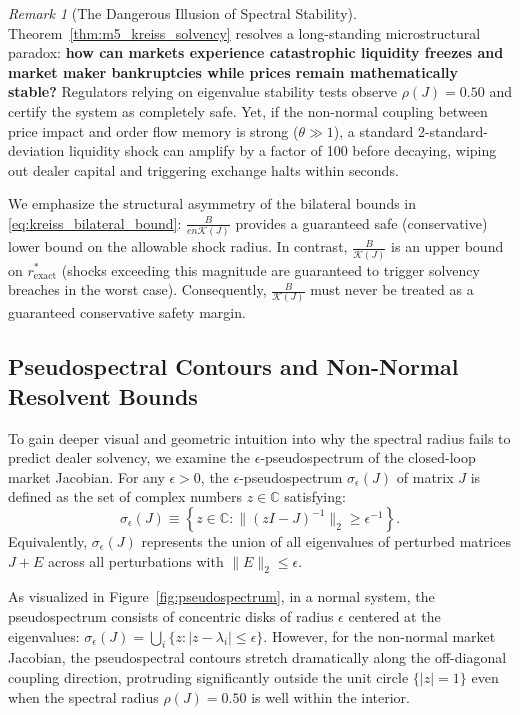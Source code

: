 \documentclass[12pt]{article}
\theoremstyle{definition}
\theoremstyle{remark}
\newtheorem{remark}[theorem]{Remark}
\begin{document}
\begin{remark}[The Dangerous Illusion of Spectral Stability]
Theorem~\ref{thm:m5_kreiss_solvency} resolves a long-standing microstructural paradox: \textbf{how can markets experience catastrophic liquidity freezes and market maker bankruptcies while prices remain mathematically stable?}
Regulators relying on eigenvalue stability tests observe $\rho(J) = 0.50$ and certify the system as completely safe. Yet, if the non-normal coupling between price impact and order flow memory is strong ($\theta \gg 1$), a standard 2-standard-deviation liquidity shock can amplify by a factor of 100 before decaying, wiping out dealer capital and triggering exchange halts within seconds. 

We emphasize the structural asymmetry of the bilateral bounds in \eqref{eq:kreiss_bilateral_bound}: $\frac{B}{e n \mathcal{K}(J)}$ provides a guaranteed safe (conservative) lower bound on the allowable shock radius. In contrast, $\frac{B}{\mathcal{K}(J)}$ is an upper bound on $r^*_{\text{exact}}$ (shocks exceeding this magnitude are guaranteed to trigger solvency breaches in the worst case). Consequently, $\frac{B}{\mathcal{K}(J)}$ must never be treated as a guaranteed conservative safety margin.
\end{remark}

\subsection{Pseudospectral Contours and Non-Normal Resolvent Bounds}
To gain deeper visual and geometric intuition into why the spectral radius fails to predict dealer solvency, we examine the $\epsilon$-pseudospectrum of the closed-loop market Jacobian. For any $\epsilon > 0$, the $\epsilon$-pseudospectrum $\sigma_\epsilon(J)$ of matrix $J$ is defined as the set of complex numbers $z \in \mathbb{C}$ satisfying:
\begin{equation}
\sigma_\epsilon(J) \equiv \left\{ z \in \mathbb{C} : \|(zI - J)^{-1}\|_2 \ge \epsilon^{-1} \right\}.
\label{eq:pseudospectrum_def}
\end{equation}
Equivalently, $\sigma_\epsilon(J)$ represents the union of all eigenvalues of perturbed matrices $J + E$ across all perturbations with $\|E\|_2 \le \epsilon$.

As visualized in Figure~\ref{fig:pseudospectrum}, in a normal system, the pseudospectrum consists of concentric disks of radius $\epsilon$ centered at the eigenvalues: $\sigma_\epsilon(J) = \bigcup_i \{z : |z - \lambda_i| \le \epsilon\}$. However, for the non-normal market Jacobian, the pseudospectral contours stretch dramatically along the off-diagonal coupling direction, protruding significantly outside the unit circle $\{|z| = 1\}$ even when the spectral radius $\rho(J) = 0.50$ is well within the interior. 
\end{document}
